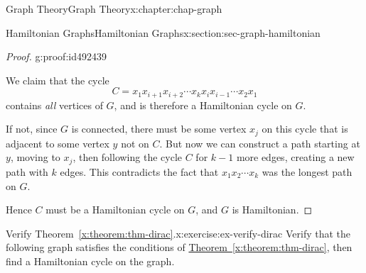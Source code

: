 \documentclass[oneside,10pt,]{book}
\newcommand{\xreffont}{\relax}
\numberwithin{equation}{section}
\begin{document}
\begin{chapterptx}{Graph Theory}{}{Graph Theory}{}{}{x:chapter:chap-graph}
\begin{sectionptx}{Hamiltonian Graphs}{}{Hamiltonian Graphs}{}{}{x:section:sec-graph-hamiltonian}
\begin{proof}{}{g:proof:id492439}
\begin{sidebyside}{1}{0.2}{0.2}{0}
\begin{sbspanel}{0.6}
{
}%
\end{sbspanel}%
\end{sidebyside}%
\par
We claim that the cycle%
\begin{equation*}
C = x_1x_{i+1}x_{i+2} \cdots x_kx_ix_{i-1}\cdots x_2x_1
\end{equation*}
contains \emph{all} vertices of \(G\), and is therefore a Hamiltonian cycle on \(G\).%
\par
If not, since \(G\) is connected, there must be some vertex \(x_j\) on this cycle that is adjacent to some vertex \(y\) not on \(C\). But now we can construct a path starting at \(y\), moving to \(x_j\), then following the cycle \(C\) for \(k-1\) more edges, creating a new path with \(k\) edges. This contradicts the fact that \(x_1x_2\cdots x_k\) was the longest path on \(G\).%
\par
Hence \(C\) must be a Hamiltonian cycle on \(G\), and \(G\) is Hamiltonian.%
\end{proof}
\begin{inlineexercise}{Verify Theorem~{\xreffont\ref*{x:theorem:thm-dirac}}.}{x:exercise:ex-verify-dirac}%
Verify that the following graph satisfies the conditions of \hyperref[x:theorem:thm-dirac]{Theorem~{\xreffont\ref{x:theorem:thm-dirac}}}, then find a Hamiltonian cycle on the graph.%
\begin{sidebyside}{1}{0.325}{0.325}{0}%
\begin{sbspanel}{0.35}%
\end{sbspanel}
\end{sidebyside}
\end{inlineexercise}
\end{sectionptx}
\end{chapterptx}
\end{document}
